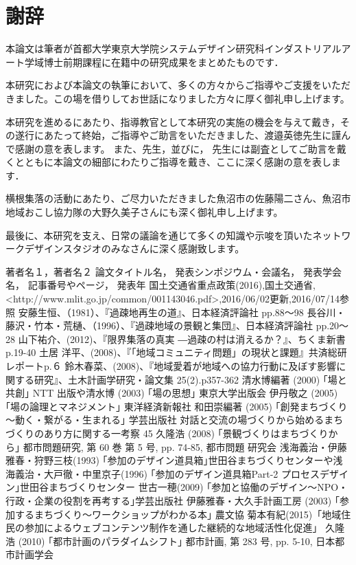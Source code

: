 \documentclass[a4paper]{jsarticle}
\begin{document}
\section*{謝辞}
\par
本論文は筆者が首都大学東京大学院システムデザイン研究科インダストリアルアート学域博士前期課程に在籍中の研究成果をまとめたものです．
\par
本研究におよび本論文の執筆において、多くの方々からご指導やご支援をいただきました。この場を借りしてお世話になりました方々に厚く御礼申し上げます。
\par
本研究を進めるにあたり、指導教官として本研究の実施の機会を与えて戴き，その遂行にあたって終始，ご指導やご助言をいただきました、渡邉英徳先生に謹んで感謝の意を表します。
また、先生，並びに， 先生には副査としてご助言を戴くとともに本論文の細部にわたりご指導を戴き、ここに深く感謝の意を表します．
\par
横根集落の活動にあたり、ご尽力いただきました魚沼市の佐藤陽二さん、魚沼市地域おこし協力隊の大野久美子さんにも深く御礼申し上げます。
\par
最後に、本研究を支え、日常の議論を通じて多くの知識や示唆を頂いたネットワークデザインスタジオのみなさんに深く感謝致します。
\newpage
\begin{thebibliography}{999}
  著者名１，著者名２
  論文タイトル名，
  発表シンポジウム・会議名，
  発表学会名，
  記事番号やページ，
  発表年
  国土交通省重点政策(2016),国土交通省,<http://www.mlit.go.jp/common/001143046.pdf>,2016/06/02更新,2016/07/14参照
  安藤生恒、（1981）、『過疎地再生の道』、日本経済評論社 pp.88～98
  長谷川・藤沢・竹本・荒樋、（1996）、『過疎地域の景観と集団』、日本経済評論社 pp.20～28
山下祐介、(2012)、『限界集落の真実 ―過疎の村は消えるか？』、ちくま新書　p.19-40
土居 洋平、(2008)、『｢地域コミュニティ問題」の現状と課題』共済総研レポートp.６
鈴木春菜、(2008)、『地域愛着が地域への協力行動に及ぼす影響に関する研究』、土木計画学研究・論文集 25(2).p357-362
清水博編著 (2000) ｢場と共創｣ NTT 出版や清水博 (2003) ｢場の思想｣ 東京大学出版会
伊丹敬之 (2005) ｢場の論理とマネジメント｣ 東洋経済新報社
和田崇編著 (2005) ｢創発まちづくり～動く・繋がる・生まれる｣ 学芸出版社 対話と交流の場づくりから始めるまちづくりのあり方に関する一考察 45
久隆浩 (2008) ｢景観づくりはまちづくりから｣ 都市問題研究, 第 60 巻 第 5 号, pp. 74-85, 都市問題 研究会
浅海義治・伊藤雅春・狩野三枝(1993) ｢参加のデザイン道具箱｣世田谷まちづくりセンターや浅海義治・大戸徹・中里京子(1996) ｢参加のデザイン道具箱Part-2 プロセスデザイン｣世田谷まちづくりセンター
世古一穂(2009) ｢参加と協働のデザイン～NPO・行政・企業の役割を再考する｣学芸出版社
伊藤雅春・大久手計画工房 (2003) ｢参加するまちづくり～ワークショップがわかる本｣ 農文協
菊本有紀(2015)「地域住民の参加によるウェブコンテンツ制作を通した継続的な地域活性化促進」
久隆浩 (2010) ｢都市計画のパラダイムシフト｣ 都市計画, 第 283 号, pp. 5-10, 日本都市計画学会


\end{thebibliography}

\newpage
\end{document}
